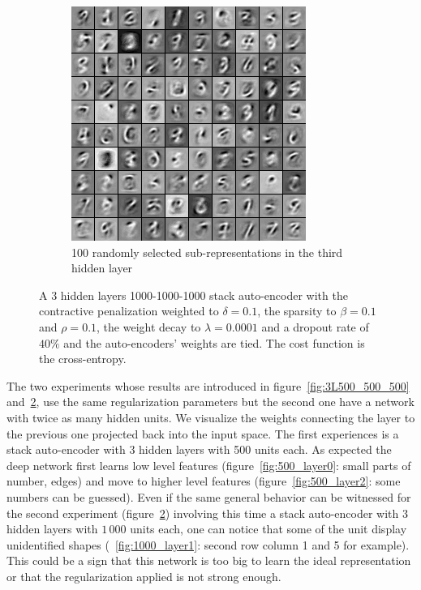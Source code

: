 \documentclass[a4paper,11pt]{report}
\begin{document}
\begin{figure}[H]
\begin{center}
\begin{subfigure}{.7\textwidth}
					\begin{center}
						\includegraphics[width=.6\linewidth]{Images/Experience/3L1000_all_layer_2.png}
						\caption{100 randomly selected sub-representations in the third hidden layer}
						\label{fig:1000_layer2}
					\end{center}
				\end{subfigure}
				\caption[A 3 hidden layers 1000-1000-1000 stack auto-encoder]{A 3 hidden layers 1000-1000-1000 stack auto-encoder with the contractive penalization weighted to $\delta=0.1$, the sparsity to $\beta=0.1$ and $\rho=0.1$, the weight decay to $\lambda=0.0001$ and a dropout rate of $40\%$ and the auto-encoders' weights are tied. The cost function is the cross-entropy.}
				\label{fig:3L1000_1000_1000}
			\end{center}
		\end{figure}
		
		The two experiments whose results are introduced in figure~\ref{fig:3L500_500_500} and~\ref{fig:3L1000_1000_1000}, use the same regularization parameters but the second one have a network with twice as many hidden units. We visualize the weights connecting the layer to the previous one projected back into the input space. The first experiences is a stack auto-encoder with 3 hidden layers with 500 units each. As expected the deep network first learns low level features (figure~\ref{fig:500_layer0}: small parts of number, edges) and move to higher level features (figure~\ref{fig:500_layer2}: some numbers can be guessed). Even if the same general behavior can be witnessed for the second experiment (figure~\ref{fig:3L1000_1000_1000}) involving this time a stack auto-encoder with 3 hidden layers with $1\,000$ units each, one can notice that some of the unit display unidentified shapes (~\ref{fig:1000_layer1}: second row column 1 and 5 for example). This could be a sign that this network is too big to learn the 
ideal representation or that the regularization applied is not strong enough.   
		
\end{document}
